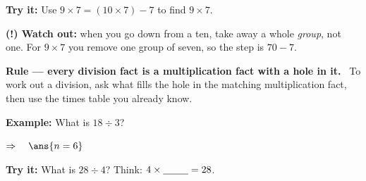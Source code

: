 \documentclass[12pt]{article}
\begin{document}
\begin{tryitbox}
\textbf{Try it:} \quad Use $9 \times 7 = (10 \times 7) - 7$ to find $9 \times 7$.\\[2pt]
\end{tryitbox}

\begin{watchoutbox}
\textbf{(!) Watch out:} when you go down from a ten, take away a whole \emph{group}, not one. For $9 \times 7$ you remove one group of seven, so the step is $70 - 7$.
\end{watchoutbox}


\begin{formulabox}
\textbf{Rule --- every division fact is a multiplication fact with a hole in it.} \ To work out a division, ask what fills the hole in the matching multiplication fact, then use the times table you already know.
\end{formulabox}

\begin{examplebox}
\textbf{Example:} \quad What is $18 \div 3$?


$\Rightarrow\quad \ans{n = 6}$
\end{examplebox}

\begin{tryitbox}
\textbf{Try it:} \quad What is $28 \div 4$? Think: $4 \times \underline{\hspace{0.9cm}} = 28$.\\[2pt]
\end{tryitbox}
\end{document}
